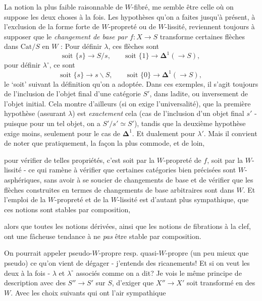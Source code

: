\documentclass[11pt]{article}
\newcommand{\printedpage}[1]{\marginpar{\footnotesize p.~#1}}
\newcommand{\msp}[1]{\marginpar{\footnotesize [#1]}}
\newcommand{\Cat}{\mathrm{Cat}}
\newcommand{\fl}{\longrightarrow}
\begin{document}
\leavevmode\msp{page 37}La notion la plus faible raisonnable de $W$-fibré, me semble être celle où on suppose les deux choses à la fois. Les hypothèses qu'on a faites jusqu'à présent, à l'exclusion de la forme forte de $W$-propreté ou de $W$-lissité, reviennent toujours à supposer que le \textit{changement de base par $f : X\longrightarrow S$} transforme certaines flèches dans $\Cat/S$ en $W$ : Pour définir $\lambda$, ces flèches sont
\[
\text{soit } \{s\}\longrightarrow S/s,\qquad \text{soit } \{1\}\longrightarrow\mathbf{\Delta}^1(\longrightarrow S),
\]
pour définir $\lambda^\circ$, ce sont
\[
\text{soit } \{s\}\longrightarrow s\backslash S,\qquad \text{soit } \{0\}\longrightarrow\mathbf{\Delta}^1(\longrightarrow S),
\]
le `soit' suivant la définition qu'on a adoptée. Dans ces exemples, il s'agit toujours de l'inclusion de l'objet final d'une catégorie $S'$, dans ladite, ou inversement de l'objet initial. Cela montre d'ailleurs (si on exige l'universalité), que la première hypothèse (assurant $\lambda$) est \textit{exactement} cela (cas de l'inclusion d'un objet final $s'$ - puisque pour un tel objet, on a $S'/s'\simeq S'$), tandis que la deuxième hypothèse exige moins, seulement pour le cas de $\mathbf{\Delta}^1$. Et dualement pour $\lambda'$. Mais il convient de noter que pratiquement, la façon la plus commode, et de loin,

\leavevmode\msp{page 38}pour vérifier de telles propriétés, c'est soit par la $W$-propreté de $f$, soit par la $W$-lissité - ce qui ramène à vérifier que certaines catégories bien précisées sont $W$-asphériques, sans avoir à se soucier de changements de base et de vérifier que les flèches construites en termes de changements de base arbitraires sont dans $W$. Et l'emploi de la $W$-propreté et de la $W$-lissité est d'autant plus sympathique, que ces notions sont stables par composition,

\printedpage{29}
alors que toutes les notions dérivées, ainsi que les notions de fibrations à la clef, ont une fâcheuse tendance à ne \textit{pas} être stable par composition.

On pourrait appeler pseudo-$W$-propre resp. quasi-$W$-propre (un peu mieux que pseudo) ce qu'on vient de dégager - j'entends des ricanements! Et si on veut les deux à la fois - $\lambda$ et $\lambda^{\circ}$ associés comme on a dit? Je vois le même principe de description avec des $S''\fl S'$ sur $S$, d'exiger que $X''\fl X'$ soit transformé en des $W$. Avec les choix suivants qui ont l'air sympathique
\end{document}

